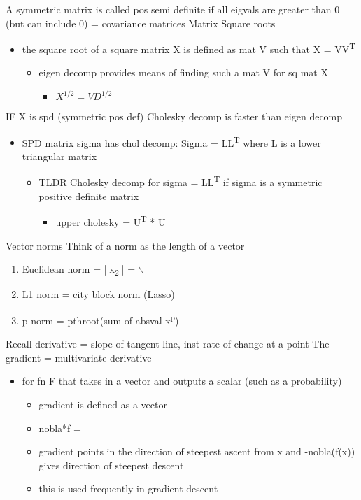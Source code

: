 \documentclass[a4paper]{article}
\begin{document}
A symmetric matrix is called pos semi definite if all eigvals are greater than 0 (but can include 0) = covariance matrices
Matrix Square roots
\begin{itemize}
\item the square root of a square matrix X is defined as mat V such that X = VV\textsuperscript{T}
\begin{itemize}
\item eigen decomp provides means of finding such a mat V for sq mat X
\begin{itemize}
\item \(X^{1/2} = VD^{1/2}\)
\end{itemize}
\end{itemize}
\end{itemize}
IF X is spd (symmetric pos def)
Cholesky decomp is faster than eigen decomp
\begin{itemize}
\item SPD matrix sigma has chol decomp:
Sigma = LL\textsuperscript{T} where L is a lower triangular matrix
\begin{itemize}
\item TLDR Cholesky decomp for sigma = LL\textsuperscript{T} if sigma is a symmetric positive definite matrix
\begin{itemize}
\item upper cholesky = U\textsuperscript{T} * U
\end{itemize}
\end{itemize}
\end{itemize}
Vector norms
Think of a norm as the length of a vector \\[0pt]
\begin{enumerate}
\item Euclidean norm = ||x\textsubscript{2}|| =  $\backslash$
\item L1 norm = city block norm (Lasso)
\item p-norm = pthroot(sum of absval x\textsuperscript{p})
\end{enumerate}
Recall derivative = slope of tangent line, inst rate of change at a point
The gradient = multivariate derivative
\begin{itemize}
\item for fn F that takes in a vector and outputs a scalar (such as a probability)
\begin{itemize}
\item gradient is defined as a vector
\item nobla*f =
\item gradient points in the direction of steepest ascent from x and -nobla(f(x)) gives direction of steepest descent
\item this is used frequently in gradient descent
\end{itemize}
\end{itemize}
\end{document}
